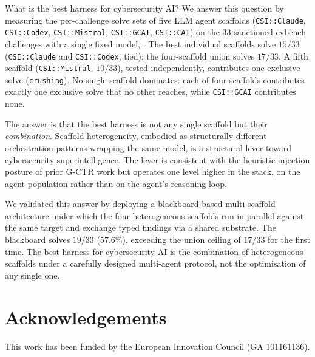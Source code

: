 What is the best harness for cybersecurity AI? We answer this question by measuring the per-challenge solve sets of five LLM agent scaffolds (\texttt{CSI::Claude}, \texttt{CSI::Codex}, \texttt{CSI::Mistral}, \texttt{CSI::GCAI}, \texttt{CSI::CAI}) on the 33 sanctioned cybench challenges with a single fixed model, \aliasmini{}. The best individual scaffolds solve $15/33$ (\texttt{CSI::Claude} and \texttt{CSI::Codex}, tied); the four-scaffold union solves $17/33$. A fifth scaffold (\texttt{CSI::Mistral}, $10/33$), tested independently, contributes one exclusive solve (\texttt{crushing}). No single scaffold dominates: each of four scaffolds contributes exactly one exclusive solve that no other reaches, while \texttt{CSI::GCAI} contributes none.

The answer is that the best harness is not any single scaffold but their \emph{combination}. Scaffold heterogeneity, embodied as structurally different orchestration patterns wrapping the same model, is a structural lever toward cybersecurity superintelligence. The lever is consistent with the heuristic-injection posture of prior G-CTR work \cite{mayoralvilches2025gametheoretic} but operates one level higher in the stack, on the agent population rather than on the agent's reasoning loop.

We validated this answer by deploying a blackboard-based multi-scaffold architecture under which the four heterogeneous scaffolds run in parallel against the same target and exchange typed findings via a shared substrate. The blackboard solves $19/33$ ($57.6\%$), exceeding the union ceiling of $17/33$ for the first time. The best harness for cybersecurity AI is the combination of heterogeneous scaffolds under a carefully designed multi-agent protocol, not the optimisation of any single one.

\section*{Acknowledgements}
This work has been funded by the European Innovation Council (GA 101161136).
